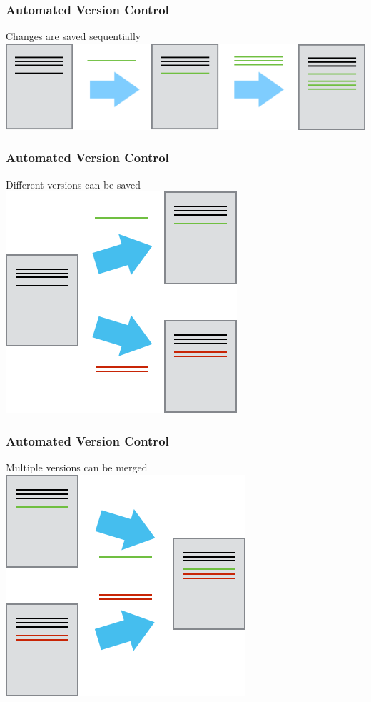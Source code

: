 \documentclass{beamer}
\begin{document}
\begin{frame}
\frametitle{Automated Version Control}
\begin{block}{Changes are saved sequentially}
\includegraphics[scale=0.65]{../fig/play-changes.png}
\end{block}
\end{frame}

\begin{frame}
\frametitle{Automated Version Control}
\begin{block}{Different versions can be saved}
\includegraphics[scale=0.8]{../fig/versions.png}
\end{block}
\end{frame}

\begin{frame}
\frametitle{Automated Version Control}
\begin{block}{Multiple versions can be merged}
\includegraphics[scale=0.8]{../fig/merge.png}
\end{block}
\end{frame}
\end{document}
